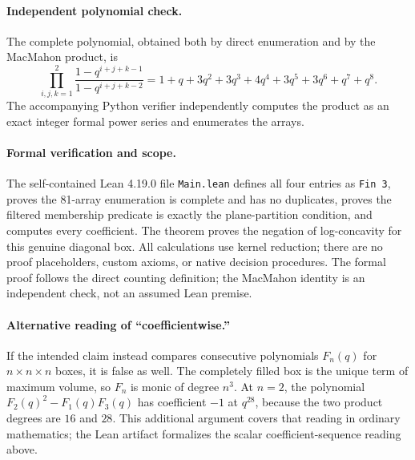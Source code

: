 \documentclass[10pt]{article}
\begin{document}
\paragraph{Independent polynomial check.}
The complete polynomial, obtained both by direct enumeration and by the
MacMahon product, is
\[
\prod_{i,j,k=1}^{2}\frac{1-q^{i+j+k-1}}{1-q^{i+j+k-2}}
=1+q+3q^2+3q^3+4q^4+3q^5+3q^6+q^7+q^8.
\]
The accompanying Python verifier independently computes the product as an
exact integer formal power series and enumerates the arrays.

\paragraph{Formal verification and scope.}
The self-contained Lean 4.19.0 file \texttt{Main.lean} defines all four entries
as \texttt{Fin 3}, proves the 81-array enumeration is complete and has no
duplicates, proves the filtered membership predicate is exactly the
plane-partition condition, and computes every coefficient. The theorem
 proves the negation of
log-concavity for this genuine diagonal box. All calculations use kernel
reduction; there are no proof placeholders, custom axioms, or native decision
procedures. The formal proof follows the direct counting definition; the
MacMahon identity is an independent check, not an assumed Lean premise.

\paragraph{Alternative reading of ``coefficientwise.''}
If the intended claim instead compares consecutive polynomials $F_n(q)$
for $n\times n\times n$ boxes, it is false as well. The completely filled
box is the unique term of maximum volume, so $F_n$ is monic of degree
$n^3$. At $n=2$, the polynomial $F_2(q)^2-F_1(q)F_3(q)$ has coefficient
$-1$ at $q^{28}$, because the two product degrees are $16$ and $28$.
This additional argument covers that reading in ordinary mathematics;
the Lean artifact formalizes the scalar coefficient-sequence reading above.
\end{document}
